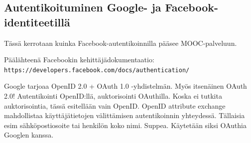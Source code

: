 \documentclass[finnish,gradu]{tktltiki}
\begin{document}



  \subsection{Autentikoituminen Google- ja Facebook-identiteetillä} %
  \label{sub:autentikoituminen_facebook}
  Tässä kerrotaan kuinka Facebook-autentikoinnilla pääsee MOOC-palveluun.

  Päälähteenä Facebookin kehittäjädokumentaatio:
  \\ \verb!https://developers.facebook.com/docs/authentication/!



  Google tarjoaa OpenID 2.0 + OAuth 1.0 -yhdistelmän. Myös itsenäinen OAuth 2.0!  Autentikointi OpenID:llä, auktorisointi OAuthilla. Koska ei tutkita auktorisointia, tässä esitellään vain OpenID.
  OpenID attribute exchange mahdollistaa käyttäjätietojen välittämisen autentikoinnin yhteydessä. Tällaisia esim sähköpostiosoite tai henkilön koko nimi. Suppea. Käytetään siksi OAuthia Googlen kanssa.
\end{document}
